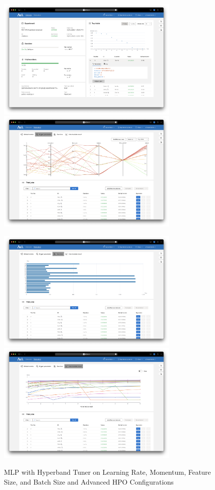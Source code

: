 \documentclass{article}
\begin{document}
\begin{figure}
	\centerline{\includegraphics[width=3.5in]{../proj3/figures/mlp_hyperband_batch_advanced_overview.png}\includegraphics[width=3.5in]{../proj3/figures/mlp_hyperband_batch_advanced_hyperparameter.png}}
	\centerline{\includegraphics[width=3.5in]{../proj3/figures/mlp_hyperband_batch_advanced_latency.png}\includegraphics[width=3.5in]{../proj3/figures/mlp_hyperband_batch_advanced_intermediate.png}}
	\caption{MLP with Hyperband Tuner on Learning Rate, Momentum, Feature Size, and Batch Size and Advanced HPO Configurations}
	\label{fig:mlp-hyperband-batch-advanced}
\end{figure}
\end{document}
